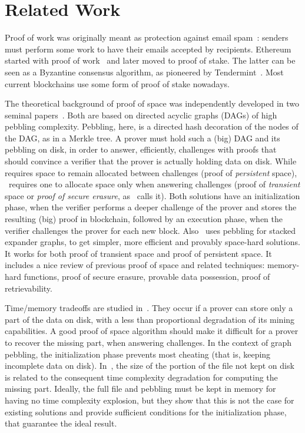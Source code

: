 \section{Related Work}\label{sec:related_work}

Proof of work was originally meant as protection against email spam~\cite{DworkN92}:
senders must perform some work to have their emails accepted by recipients.
Ethereum started with proof of work~\cite{AntonopoulosW18} and later
moved to proof of stake. The latter can be seen as a
Byzantine consensus algorithm, as pioneered by Tendermint~\cite{Kwon14}.
Most current blockchains use some form of proof of stake nowadays.

The theoretical background of proof of space was independently developed
in two seminal papers~\cite{AtenieseBFG14,DziembowskiFKP15}.
Both are based on directed acyclic graphs (DAGs) of high pebbling complexity.
Pebbling, here, is a directed hash decoration of the nodes of the DAG, as in a Merkle tree.
A prover must hold such a (big) DAG and its pebbling on disk, in order to answer, efficiently,
challenges with proofs that should convince a verifier that
the prover is actually holding data on disk.
While~\cite{DziembowskiFKP15} requires space to remain allocated between challenges
(proof of \emph{persistent} space), \cite{AtenieseBFG14}~requires one
to allocate space only when answering challenges
(proof of \emph{transient} space or \emph{proof of secure erasure}, as~\cite{DziembowskiFKP15} calls it).
Both solutions have an initialization phase, when the verifier performs a deeper challenge
of the prover and stores the resulting (big) proof in blockchain, followed by an execution phase,
when the verifier challenges the prover for each new block. Also~\cite{RenD16} uses
pebbling for stacked expander graphs, to get simpler, more efficient and
provably space-hard solutions.
It works for both proof of transient space and proof of persistent space.
It includes a nice review of previous proof of space
and related techniques: memory-hard functions, proof of secure erasure, provable data possession,
proof of retrievability.

Time/memory tradeoffs are studied in~\cite{Reyzin23}. They occur if
a prover can store only a part of the data on disk, with a less than proportional
degradation of its mining capabilities.
A good proof of space algorithm should make it difficult for a prover to recover the
missing part, when answering challenges.
In the context of graph pebbling, the initialization phase prevents most cheating
(that is, keeping incomplete data on disk). In~\cite{Reyzin23}, the size
of the portion of the file not kept on disk is related to the consequent time
complexity degradation for computing the missing part.
Ideally, the full file and pebbling must be kept in memory
for having no time complexity explosion, but they show
that this is not the case for existing solutions and
provide sufficient conditions for the initialization phase, that guarantee the ideal result.


